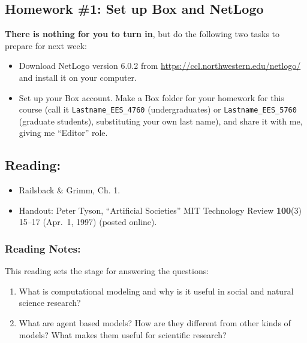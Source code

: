 \documentclass[]{article}
\providecommand{\tightlist}{%
  \setlength{\itemsep}{0pt}\setlength{\parskip}{0pt}}
\begin{document}
\hypertarget{homework-1-set-up-box-and-netlogo}{%
\subsection{Homework \#1: Set up Box and
NetLogo}\label{homework-1-set-up-box-and-netlogo}}

\textbf{There is nothing for you to turn in}, but do the following two
tasks to prepare for next week:

\begin{itemize}
\tightlist
\item
  Download NetLogo version 6.0.2 from
  \url{https://ccl.northwestern.edu/netlogo/} and install it on your
  computer.
\item
  Set up your Box account. Make a Box folder for your homework for this
  course (call it \texttt{Lastname\_EES\_4760} (undergraduates) or
  \texttt{Lastname\_EES\_5760} (graduate students), substituting your
  own last name), and share it with me, giving me ``Editor'' role.
\end{itemize}

\hypertarget{reading-1}{%
\subsection{Reading:}\label{reading-1}}

\begin{itemize}
\tightlist
\item
  Railsback \& Grimm, Ch. 1.
\item
  Handout: Peter Tyson, ``Artificial Societies'' MIT Technology Review
  \textbf{100}(3) 15--17 (Apr.~1, 1997) (posted online).
\end{itemize}

\hypertarget{reading-notes}{%
\subsubsection{Reading Notes:}\label{reading-notes}}

This reading sets the stage for answering the questions:

\begin{enumerate}
\def\labelenumi{\arabic{enumi}.}
\tightlist
\item
  What is computational modeling and why is it useful in social and
  natural science research?
\item
  What are agent based models? How are they different from other kinds
  of models? What makes them useful for scientific research?
\end{enumerate}
\end{document}
